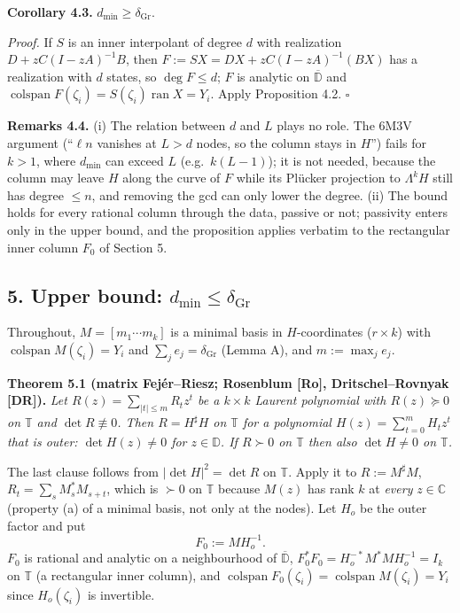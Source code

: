 \documentclass[
  11pt,
  a4paper,
]{article}
\begin{document}
\textbf{Corollary 4.3.} \(d_{\min}\ge\delta_{\mathrm{Gr}}\).

\emph{Proof.} If \(S\) is an inner interpolant of degree \(d\) with
realization \(D+zC(I-zA)^{-1}B\), then \(F:=SX=DX+zC(I-zA)^{-1}(BX)\)
has a realization with \(d\) states, so \(\deg F\le d\); \(F\) is
analytic on \(\overline{\mathbb D}\) and
\(\operatorname{colspan}F(\zeta_i)=S(\zeta_i)\operatorname{ran}X=Y_i\).
Apply Proposition 4.2. \(\square\)

\textbf{Remarks 4.4.} (i) The relation between \(d\) and \(L\) plays no
role. The 6M3V argument (``\(\ell n\) vanishes at \(L>d\) nodes, so the
column stays in \(H\)'') fails for \(k>1\), where \(d_{\min}\) can
exceed \(L\) (e.g.~\(k(L-1)\)); it is not needed, because the column may
leave \(H\) along the curve of \(F\) while its Plücker projection to
\(\Lambda^kH\) still has degree \(\le n\), and removing the gcd can only
lower the degree. (ii) The bound holds for every rational column through
the data, passive or not; passivity enters only in the upper bound, and
the proposition applies verbatim to the rectangular inner column \(F_0\)
of Section 5.

\subsection{\texorpdfstring{5. Upper bound:
\(d_{\min}\le\delta_{\mathrm{Gr}}\)}{5. Upper bound: d\_\{\textbackslash min\}\textbackslash le\textbackslash delta\_\{\textbackslash mathrm\{Gr\}\}}}\label{upper-bound-d_minledelta_mathrmgr}

Throughout, \(M=[m_1\cdots m_k]\) is a minimal basis in
\(H\)-coordinates (\(r\times k\)) with
\(\operatorname{colspan}M(\zeta_i)=Y_i\) and
\(\sum_je_j=\delta_{\mathrm{Gr}}\) (Lemma A), and \(m:=\max_je_j\).

\textbf{Theorem 5.1 (matrix Fejér--Riesz; Rosenblum {[}Ro{]},
Dritschel--Rovnyak {[}DR{]}).} \emph{Let \(R(z)=\sum_{|t|\le m}R_tz^t\)
be a \(k\times k\) Laurent polynomial with \(R(z)\succeq0\) on
\(\mathbb T\) and \(\det R\not\equiv0\). Then \(R=H^\sharp H\) on
\(\mathbb T\) for a polynomial \(H(z)=\sum_{t=0}^mH_tz^t\) that is
outer: \(\det H(z)\ne0\) for \(z\in\mathbb D\). If \(R\succ0\) on
\(\mathbb T\) then also \(\det H\ne0\) on \(\mathbb T\).}

The last clause follows from \(|\det H|^2=\det R\) on \(\mathbb T\).
Apply it to \(R:=M^\sharp M\), \(R_t=\sum_sM_s^*M_{s+t}\), which is
\(\succ0\) on \(\mathbb T\) because \(M(z)\) has rank \(k\) at
\emph{every} \(z\in\mathbb C\) (property (a) of a minimal basis, not
only at the nodes). Let \(H_o\) be the outer factor and put
\[F_0:=MH_o^{-1}.\] \(F_0\) is rational and analytic on a neighbourhood
of \(\overline{\mathbb D}\), \(F_0^*F_0=H_o^{-*}M^*MH_o^{-1}=I_k\) on
\(\mathbb T\) (a rectangular inner column), and
\(\operatorname{colspan}F_0(\zeta_i)=\operatorname{colspan}M(\zeta_i)=Y_i\)
since \(H_o(\zeta_i)\) is invertible.
\end{document}
